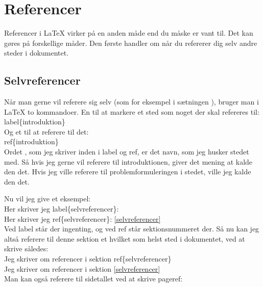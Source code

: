 \chapter{Referencer}
Referencer i LaTeX virker på en anden måde end du måske er vant til. Det kan gøres på forskellige måder. Den første handler om når du refererer dig selv andre steder i dokumentet.
\label{chap:referencer}

\section{Selvreferencer}
Når man gerne vil referere sig selv (som for eksempel i sætningen ), bruger man i LaTeX to kommandoer. En til at markere et sted som noget der skal refereres til:\\

\bs label\{introduktion\}\\

\noindent
Og et til at referere til det:\\

\bs ref\{introduktion\}\\

\noindent
Ordet , som jeg skriver inden i \bs label og \bs ref, er det navn, som jeg husker stedet med. Så hvis jeg gerne vil referere til introduktionen, giver det mening at kalde den det. Hvis jeg ville referere til problemformuleringen i stedet, ville jeg kalde den det.

\noindent
Nu vil jeg give et eksempel:\\

\indent Her skriver jeg \bs label\{selvreferencer\}: \label{selvreferencer}\\
\indent Her skriver jeg \bs ref\{selvreferencer\}: \ref{selvreferencer}\\

\noindent
Ved \bs label står der ingenting, og ved \bs ref står sektionsnummeret der. Så nu kan jeg altså referere til denne sektion et hvilket som helst sted i dokumentet, ved at skrive således:\\

\indent Jeg skriver om referencer i sektion \bs ref\{selvreferencer\}\\
\indent Jeg skriver om referencer i sektion \ref{selvreferencer}\\

\noindent
Man kan også referere til sidetallet ved at skrive \bs pageref:\\

